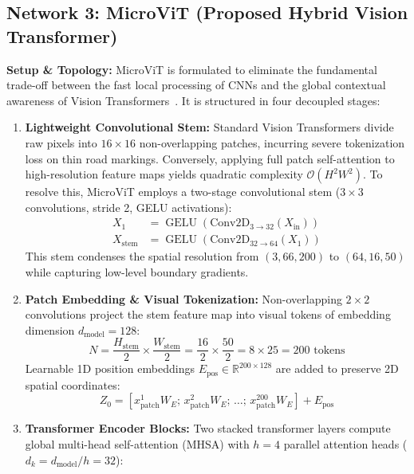 \documentclass[10pt,journal,compsoc]{IEEEtran}
\begin{document}
\subsection{Network 3: MicroViT (Proposed Hybrid Vision Transformer)}
\textbf{Setup \& Topology:} MicroViT is formulated to eliminate the fundamental trade-off between the fast local processing of CNNs and the global contextual awareness of Vision Transformers~\cite{dosovitskiy2020image,liu2021swin}. It is structured in four decoupled stages:
\begin{enumerate}
    \item \textbf{Lightweight Convolutional Stem:} Standard Vision Transformers divide raw pixels into $16 \times 16$ non-overlapping patches, incurring severe tokenization loss on thin road markings. Conversely, applying full patch self-attention to high-resolution feature maps yields quadratic complexity $\mathcal{O}(H^2 W^2)$. To resolve this, MicroViT employs a two-stage convolutional stem ($3 \times 3$ convolutions, stride 2, GELU activations):
    \begin{align}
    X_1 &= \operatorname{GELU}(\text{Conv2D}_{3 \to 32}(X_{\text{in}})) \\
    X_{\text{stem}} &= \operatorname{GELU}(\text{Conv2D}_{32 \to 64}(X_1))
    \end{align}
    This stem condenses the spatial resolution from $(3, 66, 200)$ to $(64, 16, 50)$ while capturing low-level boundary gradients.
    \item \textbf{Patch Embedding \& Visual Tokenization:} Non-overlapping $2 \times 2$ convolutions project the stem feature map into visual tokens of embedding dimension $d_{\text{model}} = 128$:
    \begin{equation}
    N = \frac{H_{\text{stem}}}{2} \times \frac{W_{\text{stem}}}{2} = \frac{16}{2} \times \frac{50}{2} = 8 \times 25 = 200 \text{ tokens}
    \end{equation}
    Learnable 1D position embeddings $E_{\text{pos}} \in \mathbb{R}^{200 \times 128}$ are added to preserve 2D spatial coordinates:
    \begin{equation}
    Z_0 = [x_{\text{patch}}^1 W_E; \, x_{\text{patch}}^2 W_E; \, \dots; \, x_{\text{patch}}^{200} W_E] + E_{\text{pos}}
    \end{equation}
    \item \textbf{Transformer Encoder Blocks:} Two stacked transformer layers compute global multi-head self-attention (MHSA) with $h = 4$ parallel attention heads ($d_k = d_{\text{model}} / h = 32$):

\end{enumerate}
\end{document}
